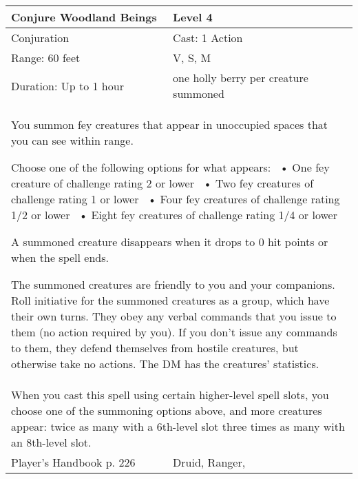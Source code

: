 \documentclass[11pt]{report}
\begin{document}
\begin{table}[H]
	\begin{tabular}{||p{6cm}|p{6cm}||}
		\hline\hline
		\bf{Conjure Woodland Beings} & Level 4\\ \hline
		Conjuration & Cast: 1 Action\\ \hline
		Range: 60 feet & V, S, M \\ \hline
		Duration: Up to 1 hour & one holly berry per creature summoned\\ \hline
		\multicolumn{2}{||p{12cm}||}{You summon fey creatures that appear in unoccupied spaces that you can see within range. 

Choose one of the following options for what appears: 
 •  One fey creature of challenge rating 2 or lower 
 •  Two fey creatures of challenge rating 1 or lower 
 •  Four fey creatures of challenge rating 1/2 or lower 
 •  Eight fey creatures of challenge rating 1/4 or lower 

A summoned creature disappears when it drops to 0 hit points or when the spell ends. 

The summoned creatures are friendly to you and your companions. Roll initiative for the summoned creatures as a group, which have their own turns. They obey any verbal commands that you issue to them (no action required by you). If you don’t issue any commands to them, they defend themselves from hostile creatures, but otherwise take no actions. 
The DM has the creatures’ statistics.}\\ \hline
		\multicolumn{2}{||p{12cm}||}{When you cast this spell using certain higher-level spell slots, you choose one of the summoning options above, and more creatures appear: 
twice as many with a 6th-level slot
three times as many with an 8th-level slot.}\\ \hline
Player's Handbook p. 226 & Druid, Ranger, \\ \hline\hline
	\end{tabular}
\end{table}
\end{document}
